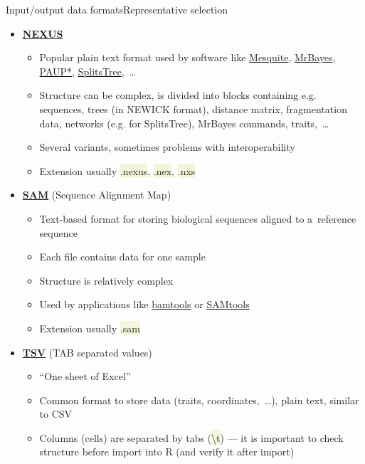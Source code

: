 \documentclass[compress, xelatex, 11pt, xcolor=svgnames, aspectratio=169,
	hyperref={
		bookmarks=true,
		unicode=true,
		colorlinks=true,
		pdftitle={Molecular data in R},
		plainpages=false,
		pdfauthor={Vojtech Zeisek},
		pdfsubject={Course about phylogeny and evolution in R},
		pdfcreator={XeLaTeX},
		pdfkeywords={R, evolution, phylogeny, molecular data},
		linkcolor=Crimson, %
		anchorcolor=Magenta, %
		citecolor=Magenta, %
		filecolor=Magenta, %
		menucolor=Magenta, %
		urlcolor=DodgerBlue, %
		},
	url={hyphens, lowtilde} %
	]{beamer}
\renewcommand{\texttt}[1]{\colorbox{Beige}{{\ttfamily #1}}}
\begin{document}
\begin{frame}[allowframebreaks]{Input/output data formats}{Representative selection}
\begin{itemize}
\begin{itemize}
			\item Extension usually \texttt{*.newick}, \texttt{*.nwk}, \texttt{*.tre},~\ldots
		\end{itemize}
		\item \href{https://en.wikipedia.org/wiki/Nexus_file}{\textbf{NEXUS}}
		\begin{itemize}
			\item Popular plain text format used by software like \href{https://mesquiteproject.org/}{Mesquite}, \href{https://nbisweden.github.io/MrBayes/}{MrBayes}, \href{https://paup.phylosolutions.com/}{PAUP*}, \href{https://en.wikipedia.org/wiki/SplitsTree}{SplitsTree},~\ldots
			\item Structure can be complex, is divided into blocks containing e.g. sequences, trees (in NEWICK format), distance matrix, fragmentation data, networks (e.g. for SplitsTree), MrBayes commands, traits,~\ldots
			\item Several variants, sometimes problems with interoperability
			\item Extension usually \texttt{*.nexus}, \texttt{*.nex}, \texttt{*.nxs}
		\end{itemize}
		\item \href{https://en.wikipedia.org/wiki/SAM_(file_format)}{\textbf{SAM}} (Sequence Alignment Map)
		\begin{itemize}
			\item Text-based format for storing biological sequences aligned to a~reference sequence
			\item Each file contains data for one sample
			\item Structure is relatively complex
			\item Used by applications like \href{https://github.com/pezmaster31/bamtools/wiki}{bamtools} or \href{https://www.htslib.org/}{SAMtools}
			\item Extension usually \texttt{*.sam}
		\end{itemize}
		\item \href{https://en.wikipedia.org/wiki/Tab-separated_values}{\textbf{TSV}} (TAB separated values)
		\begin{itemize}
			\item \enquote{One sheet of Excel}
			\item Common format to store data (traits, coordinates,~\ldots), plain text, similar to CSV
			\item Columns (cells) are separated by tabs (\texttt{\textbackslash t}) --- it is important to check structure before import into R (and verify it after import)

\end{itemize}
\end{itemize}
\end{frame}
\end{document}
